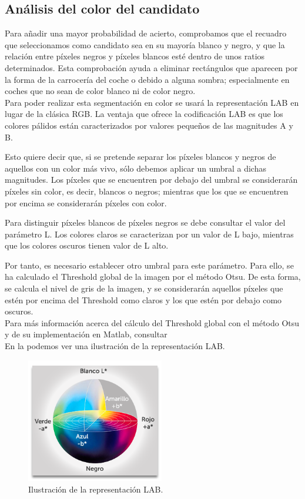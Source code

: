 \subsection{Análisis del color del candidato}
Para añadir una mayor probabilidad de acierto, comprobamos que el recuadro que seleccionamos como candidato sea en su mayoría blanco y negro, y que la relación entre píxeles negros y píxeles blancos esté dentro de unos ratios determinados. Esta comprobación ayuda a eliminar rectángulos que aparecen por la forma de la carrocería del coche o debido a alguna sombra; especialmente en coches que no sean de color blanco ni de color negro.\\

Para poder realizar esta segmentación en color se usará la representación LAB en lugar de la clásica RGB. La ventaja que ofrece la codificación LAB es que los colores pálidos están caracterizados por valores pequeños de las magnitudes A y B.

Esto quiere decir que, si se pretende separar los píxeles blancos y negros de aquellos con un color más vivo, sólo debemos aplicar un umbral a dichas magnitudes. Los píxeles que se encuentren por debajo del umbral se considerarán píxeles sin color, es decir, blancos o negros; mientras que los que se encuentren por encima se considerarán píxeles con color. 

Para distinguir píxeles blancos de píxeles negros se debe consultar el valor del parámetro L. Los colores claros se caracterizan por un valor de L bajo, mientras que los colores oscuros tienen valor de L alto.

Por tanto, es necesario establecer otro umbral para este parámetro. Para ello, se ha calculado el Threshold global de la imagen por el método Otsu. De esta forma, se calcula el nivel de gris de la imagen, y se considerarán aquellos píxeles que estén por encima del Threshold como claros y los que estén por debajo como oscuros.\\

Para más información acerca del cálculo del Threshold global con el método Otsu y de su implementación en Matlab, consultar \cite{ImgProcessMat}\\

En la  podemos ver una ilustración de la representación LAB.\\

\begin{figure}[!h]
\centering
\includegraphics[width=6cm]{LAB.png}
\caption{\small{Ilustración de la representación LAB.}}
\label{ModeloLAB}
\end{figure}

